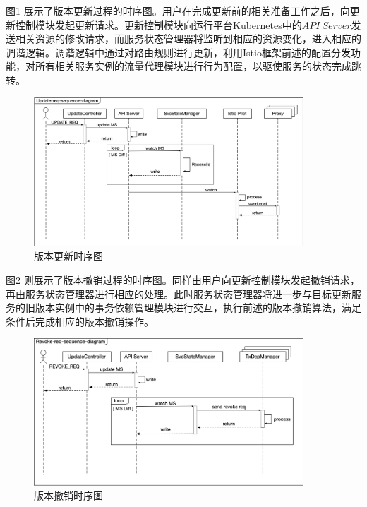 \documentclass[macfonts,master]{njuthesis}
\begin{document}
图\ref{fig:update_sequence} 展示了版本更新过程的时序图。用户在完成更新前的相关准备工作之后，向更新控制模块发起更新请求。更新控制模块向运行平台Kubernetes中的$API~Server$发送相关资源的修改请求，而服务状态管理器将监听到相应的资源变化，进入相应的调谐逻辑。调谐逻辑中通过对路由规则进行更新，利用Istio框架前述的配置分发功能，对所有相关服务实例的流量代理模块进行行为配置，以驱使服务的状态完成跳转。

\begin{figure}[!htbp]
  \centering
  \includegraphics[width= 0.9\textwidth]{image/update_sequence.png}
  \caption{版本更新时序图}
  \label{fig:update_sequence}
\end{figure}

图\ref{fig:revoke_sequence} 则展示了版本撤销过程的时序图。同样由用户向更新控制模块发起撤销请求，再由服务状态管理器进行相应的处理。此时服务状态管理器将进一步与目标更新服务的旧版本实例中的事务依赖管理模块进行交互，执行前述的版本撤销算法，满足条件后完成相应的版本撤销操作。

\begin{figure}[!htbp]
  \centering
  \includegraphics[width= 0.9\textwidth]{image/revoke_sequence.png}
  \caption{版本撤销时序图}
  \label{fig:revoke_sequence}
\end{figure}
\end{document}
